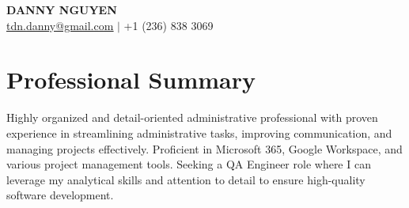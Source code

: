 \documentclass[letterpaper,11pt]{article}
\begin{document}
\begin{center}
\textbf{\Huge \scshape DANNY NGUYEN} \\ \vspace{1pt}
\small \href{mailto:tdn.danny@gmail.com}{\underline{tdn.danny@gmail.com}} $|$ +1 (236) 838 3069
\end{center}

\section{Professional Summary}
Highly organized and detail-oriented administrative professional with proven experience in streamlining administrative tasks, improving communication, and managing projects effectively.  Proficient in Microsoft 365, Google Workspace, and various project management tools.  Seeking a QA Engineer role where I can leverage my analytical skills and attention to detail to ensure high-quality software development.
\end{document}
